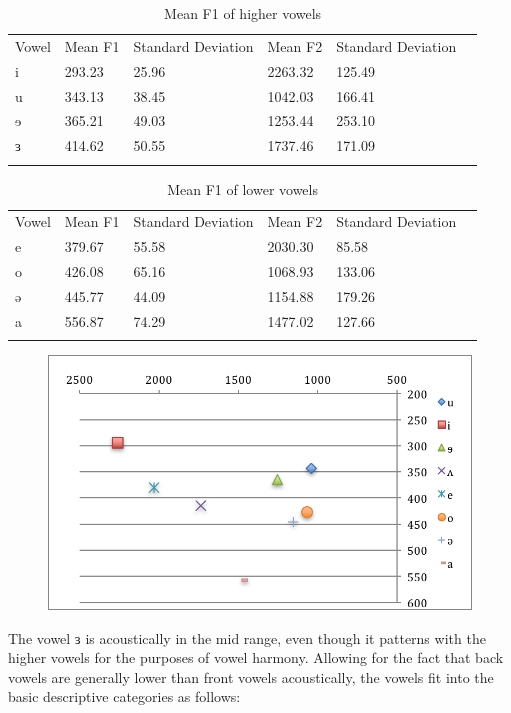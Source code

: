 \begin{table}
	\begin{tabular}[t]{llllll}
	\lsptoprule 
Vowel	&	Mean F1	&	Standard Deviation	&	Mean F2	&	Standard Deviation\\
i   	&	293.23	&	25.96	&	2263.32	&	125.49\\
u	&	343.13	&	38.45	&	1042.03	&	166.41\\
ɘ	&	365.21	&	49.03	&	1253.44	&	253.10\\
ɜ	&	414.62	&	50.55	&	1737.46	&	171.09\\
\lspbottomrule 
	\end{tabular}
	\caption{Mean F1 of higher vowels}
	\label{tab:ch5:1}
\end{table} 

\begin{table}
	\begin{tabular}[t]{llllll}
	\lsptoprule 
Vowel	&	Mean F1	&	Standard Deviation	&	Mean F2	&	Standard Deviation\\
e	&	379.67 	&	55.58	&	2030.30	&	85.58\\
o	&	426.08 	&	65.16	&	1068.93	&	133.06\\
ə	&	445.77 	&	44.09	&	1154.88	&	179.26\\
a	&	556.87 	&	74.29	&	1477.02	&	127.66\\
\lspbottomrule 
	\end{tabular}
	\caption{Mean F1 of lower vowels}
	\label{tab:ch5:2}
\end{table} 

\begin{figure}
  \includegraphics[width=\linewidth]{figures/fig-ch5-1.png}
  \label{fig:5-1}
\end{figure}

The vowel ɜ is acoustically in the mid range, even though it patterns with the higher vowels for the purposes of vowel harmony. Allowing for the fact that back vowels are generally lower than front vowels acoustically, the vowels fit into the basic descriptive categories as follows:

